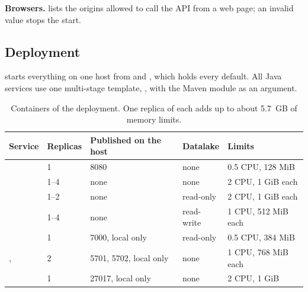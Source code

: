 \textbf{Browsers.}  lists the origins allowed to call the API from a web page; an invalid value
stops the start.

\subsection{Deployment}
\label{sec:deployment}

 starts everything on one host from  and , which
holds every default. All Java services use one multi-stage template, , with the
Maven module as an argument.

\begin{table}[H]
\centering\small
\begin{tabularx}{\linewidth}{@{}L{2.5cm}L{1.5cm}L{2.9cm}L{1.9cm}X@{}}
\toprule
\textbf{Service} & \textbf{Replicas} & \textbf{Published on the host} & \textbf{Datalake} & \textbf{Limits} \\
\midrule
{} & 1 & 8080 & none & 0.5 CPU, 128 MiB \\
 & 1--4 & none & none & 2 CPU, 1 GiB each \\
 & 1--2 & none & read-only & 2 CPU, 1 GiB each \\
 & 1--4 & none & read-write & 1 CPU, 512 MiB each \\
 & 1 & 7000, local only & read-only & 0.5 CPU, 384 MiB \\
,  & 2 & 5701, 5702, local only & none & 1 CPU, 768 MiB each \\
 & 1 & 27017, local only & none & 2 CPU, 1 GiB \\
\bottomrule
\end{tabularx}
\caption{Containers of the deployment. One replica of each adds up to about 5.7~GB of memory limits.}
\end{table}

